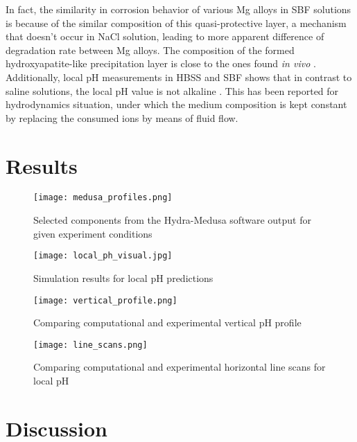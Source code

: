 In fact, the similarity in corrosion behavior of various Mg alloys in SBF solutions is because of the similar composition of this quasi-protective layer, a mechanism that doesn't occur in NaCl solution, leading to more apparent difference of degradation rate between Mg alloys. The composition of the formed hydroxyapatite-like precipitation layer is close to the ones found \textit{in vivo} \cite{Mei2020}. Additionally, local pH measurements in HBSS and SBF shows that in contrast to saline solutions, the local pH value is not alkaline \cite{Lamaka2018,Mei2021}. This has been reported for hydrodynamics situation, under which the medium composition is kept constant by replacing the consumed ions by means of fluid flow. 


\section{Results}

\begin{figure}[h]
\centering
\medskip
\texttt{[image: medusa\_profiles.png]}
\caption[Hydra-Medusa software output for given experiment conditions]{Selected components from the Hydra-Medusa software output for given experiment conditions} \label{fig:kinetics_medusa_profiles}
\end{figure}

\begin{figure}[h]
\centering
\medskip
\texttt{[image: local\_ph\_visual.jpg]}
\caption[Simulation results for local pH predictions]{Simulation results for local pH predictions} \label{fig:kinetics_local_ph_visual}
\end{figure}

\begin{figure}[h]
\centering
\medskip
\texttt{[image: vertical\_profile.png]}
\caption[Comparing computational and experimental vertical pH profile]{Comparing computational and experimental vertical pH profile} \label{fig:kinetics_vertical_profile}
\end{figure}

\begin{figure}[h]
\centering
\medskip
\texttt{[image: line\_scans.png]}
\caption[Comparing computational and experimental horizontal line scans for  local pH]{Comparing computational and experimental horizontal line scans for  local pH} \label{fig:kinetics_line_scans}
\end{figure}

\section{Discussion}

